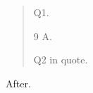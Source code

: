 \documentclass{article}
\begin{document}
\begin{quote}Q1. \begin{minipage}{\textwidth}\begin{thebibliography}{9} A.\end{thebibliography}\end{minipage} Q2 in quote.\end{quote} After.
\end{document}
